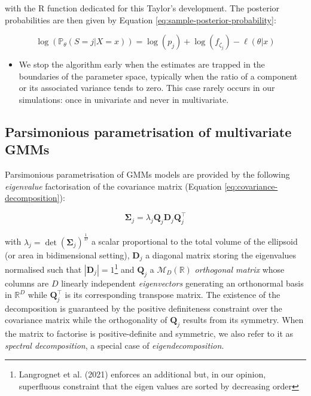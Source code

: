 with  the R function dedicated for this Taylor's development. The posterior probabilities are then given by Equation
\eqref{eq:sample-posterior-probability}:

\begin{equation}
\log\left(\mathbb{P}_\theta(S=j | X=x)\right)=\log(p_j) + \log(f_{\zeta_j}) - \ell (\theta |x)
\label{eq:sample-posterior-probability}
\end{equation}

\begin{itemize}
\tightlist
\item
  We stop the algorithm early when the estimates are trapped in the boundaries of the parameter space, typically when the ratio of a component or its associated variance tends to zero. This case rarely occurs in our simulations: once in univariate and never in multivariate.
\end{itemize}

\hypertarget{parsimonious-parametrisation-of-multivariate-gmms}{%
\subsection{Parsimonious parametrisation of multivariate GMMs}\label{parsimonious-parametrisation-of-multivariate-gmms}}

\label{subsec:parsimonious-parametrisation}

Parsimonious parametrisation of GMMs models are provided by the following \emph{eigenvalue} factorisation of the covariance matrix (Equation \eqref{eq:covariance-decomposition}):

\begin{equation}
    \boldsymbol{\Sigma}_j=\lambda_j \boldsymbol{Q}_j \boldsymbol{D}_j \boldsymbol{Q}_j^\top
    \label{eq:covariance-decomposition}
\end{equation}

with \(\lambda_j=\operatorname{det}\left(\boldsymbol{\Sigma}_j\right)^{\frac{1}{D}}\) a scalar proportional to the total volume of the ellipsoid (or area in bidimensional setting), \(\boldsymbol{D}_j\) a diagonal matrix storing the eigenvalues normalised such that \(|\boldsymbol{D}_j|=1\)\footnote{Langrognet et al. (2021) enforces an additional but, in our opinion, superfluous constraint that the eigen values are sorted by decreasing order} and \(\boldsymbol{Q}_j\) a \(\mathcal{M}_D(\mathbb{R})\) \emph{orthogonal matrix} whose
columns are \(D\) linearly independent \emph{eigenvectors} generating an orthonormal basis in \(\mathbb{R}^D\) while \(\boldsymbol{Q}_j^\top\) is its corresponding transpose matrix. The existence of the decomposition is guaranteed by the positive definiteness constraint over the covariance matrix while the orthogonality of \(\boldsymbol{Q}_j\) results from its symmetry. When the matrix to factorise is positive-definite and symmetric, we also refer to it as \emph{spectral decomposition}, a special case of \emph{eigendecomposition}.

